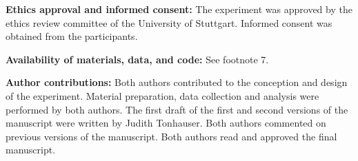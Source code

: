 \documentclass[11pt,fleqn]{article}
\newcommand{\6}{\mbox{$[\hspace*{-.6mm}[$}}
\newcommand{\9}{\mbox{$]\hspace*{-.6mm}]$}}
\begin{document}
\bigskip

\noindent
{\bf Ethics approval and informed consent:} The experiment was approved by the ethics review committee of the University of Stuttgart. Informed consent was obtained from the participants.

\bigskip

\noindent
{\bf Availability of materials, data, and code:} See footnote 7.

\bigskip

\noindent
{\bf Author contributions:} Both authors contributed to the conception and design of the experiment. Material preparation, data collection and analysis were performed by both authors. The first draft of the first and second versions of the manuscript were written by Judith Tonhauser. Both authors commented on previous versions of the manuscript. Both authors read and approved the final manuscript.


%


%



 
\end{document}
